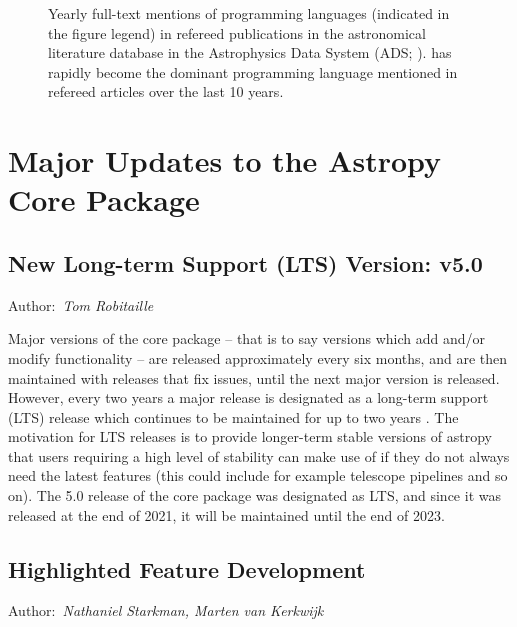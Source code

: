 \documentclass[modern]{aastex631}
\newcommand{\secauthor}[1]{{\color{blue}Author:~\textit{#1}}}
\begin{document}
\begin{figure}
    \begin{centering}
        \caption{
            Yearly full-text mentions of programming languages (indicated in the
            figure legend) in refereed publications in the astronomical
            literature database in the Astrophysics Data System (ADS;
            \citealt{ads}).
            \python has rapidly become the dominant programming language
            mentioned in refereed articles over the last 10 years.
        }
        \label{fig:python-mentions}
    \end{centering}
\end{figure}


\section{Major Updates to the Astropy Core Package} \label{sec:core-updates}

\subsection{New Long-term Support (LTS) Version: v5.0} \label{sec:core-v50}

\secauthor{Tom Robitaille}

Major versions of the core package -- that is to say versions which add and/or
modify functionality -- are released approximately every six months, and are
then maintained with releases that fix issues, until the next major version
is released. However, every two years a major release is designated as a
long-term support (LTS) release which continues to be maintained for up to two
years \citep{ape2}. The motivation for LTS releases is to provide longer-term stable
versions of astropy that users requiring a high level of stability can make
use of if they do not always need the latest features (this could include
for example telescope pipelines and so on). The 5.0 release of the core package was designated as LTS,
and since it was released at the end of 2021, it will be maintained until the
end of 2023.


\subsection{Highlighted Feature Development} \label{sec:core-features}

\secauthor{Nathaniel Starkman, Marten van Kerkwijk}
\end{document}
